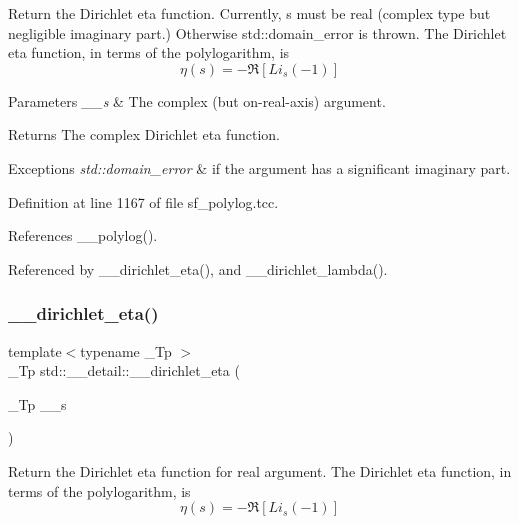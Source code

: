 Return the Dirichlet eta function. Currently, s must be real (complex type but negligible imaginary part.) Otherwise std\+::domain\+\_\+error is thrown. The Dirichlet eta function, in terms of the polylogarithm, is \[ \eta(s) = -\Re[Li_s(-1)] \]


\begin{DoxyParams}{Parameters}
{\em \+\_\+\+\_\+s} & The complex (but on-\/real-\/axis) argument. \\
\hline
\end{DoxyParams}
\begin{DoxyReturn}{Returns}
The complex Dirichlet eta function. 
\end{DoxyReturn}

\begin{DoxyExceptions}{Exceptions}
{\em std\+::domain\+\_\+error} & if the argument has a significant imaginary part. \\
\hline
\end{DoxyExceptions}


Definition at line 1167 of file sf\+\_\+polylog.\+tcc.



References \+\_\+\+\_\+polylog().



Referenced by \+\_\+\+\_\+dirichlet\+\_\+eta(), and \+\_\+\+\_\+dirichlet\+\_\+lambda().

\mbox{\label{namespacestd_1_1____detail_a88be5bbcdf85bbc487b6b86b5cb65d98}} 
\subsubsection{\texorpdfstring{\+\_\+\+\_\+dirichlet\+\_\+eta()}{\_\_dirichlet\_eta()}\hspace{0.1cm}{\footnotesize\ttfamily [2/2]}}
{\footnotesize\ttfamily template$<$typename \+\_\+\+Tp $>$ \\
\+\_\+\+Tp std\+::\+\_\+\+\_\+detail\+::\+\_\+\+\_\+dirichlet\+\_\+eta (\begin{DoxyParamCaption}\item[{\+\_\+\+Tp}]{\+\_\+\+\_\+s }\end{DoxyParamCaption})}

Return the Dirichlet eta function for real argument. The Dirichlet eta function, in terms of the polylogarithm, is \[ \eta(s) = -\Re[Li_s(-1)] \]


